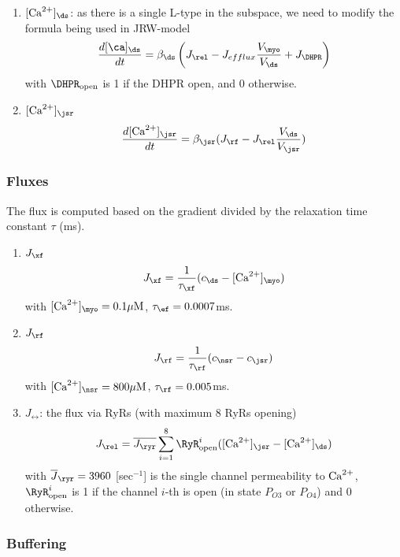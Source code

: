 \begin{enumerate}
\item $[\Ca]_\ds$: as there is a single L-type in the subspace, we
  need to modify the formula being used in JRW-model
  \begin{equation}
    \label{eq:542}
    \frac{d[\ca]_\ds}{dt} = \beta_\ds \left( J_\rel 
       - J_{efflux }\frac{V_\myo}{V_\ds} + J_\DHPR 
         \right)
  \end{equation}
  with $\DHPR_\open$ is 1 if the DHPR open, and 0 otherwise. 


\item $[\Ca]_\jsr$
  \begin{equation}
    \label{eq:1265}
    \frac{d[\Ca]_\jsr}{dt} = \beta_\jsr( J_\rf - J_\rel\frac{V_\ds}{V_\jsr})
  \end{equation}
\end{enumerate}
\subsubsection{Fluxes}
\label{sec:fluxes-5}

The flux is computed based on the gradient divided by the relaxation
time constant $\tau$ (ms).
\begin{enumerate}
\item $J_\xf$
\begin{equation}
  \label{eq:1027}
  J_\xf = \frac{1}{\tau_\xf}(c_\ds - [\Ca]_\myo)
\end{equation}
with $[\Ca]_\myo=0.1\muM$, $\tau_\ef = 0.0007$ms.
\item $J_\rf$
  \begin{equation}
    \label{eq:1028}
    J_\rf = \frac{1}{\tau_\rf}(c_\nsr-c_\jsr)
  \end{equation}
with $[\Ca]_\nsr=800\muM$, $\tau_\rf=0.005$ms.


\item $J_\rel$: the flux via RyRs (with maximum 8 RyRs opening)
  \begin{equation}
    \label{eq:543}
    J_\rel = \overline{J_\ryr} \sum^8_{i=1}  \RyR^i_\open ([\Ca]_\jsr-[\Ca]_\ds)
  \end{equation}
  with $\overline{J}_\ryr=3960$ [sec$^{-1}$] is the single channel
  permeability to ${\text{Ca}^{2+}}$, $\RyR^i_\open$ is 1 if the channel $i$-th is
  open (in state $P_{O3}$ or $P_{O4}$) and 0 otherwise.
\end{enumerate}

\subsubsection{Buffering}
\label{sec:buffering-5}

